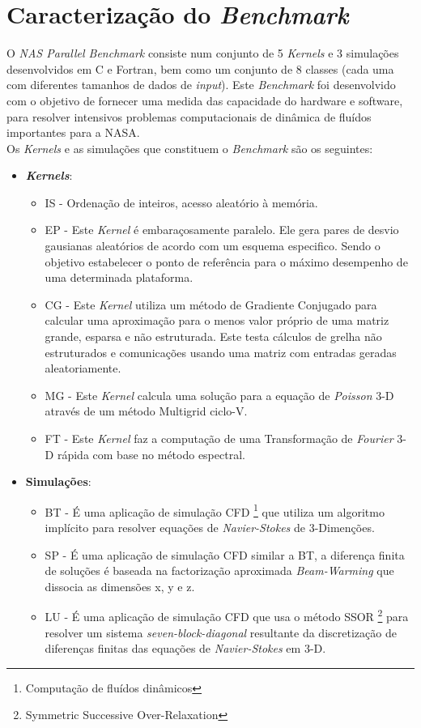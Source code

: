 \documentclass[conference,compsoc]{IEEEtran}
\begin{document}
\section{Caracterização do \textit{Benchmark}}
O \textit{NAS Parallel Benchmark}\cite{nas_bench} consiste num conjunto de 5 \textit{Kernels} e 3 simulações desenvolvidos em C e Fortran, bem como um conjunto de 8 classes (cada uma com diferentes tamanhos de dados de \textit{input}). Este \textit{Benchmark} foi desenvolvido com o objetivo de fornecer uma medida das capacidade do hardware e software, para resolver intensivos problemas computacionais de dinâmica de fluídos importantes para a NASA.\\
Os \textit{Kernels} e as simulações que constituem o \textit{Benchmark} são os seguintes:
\begin{itemize}
\item \textit{\textbf{Kernels}}:
\begin{itemize}
\item IS\cite{nas_site} - Ordenação de inteiros, acesso aleatório à memória.
\item EP\cite{nas_bench_1} - Este \textit{Kernel} é embaraçosamente paralelo. Ele gera pares de desvio gausianas aleatórios de acordo com um esquema especifico. Sendo o objetivo estabelecer o ponto de referência para o máximo desempenho de uma determinada plataforma.
\item CG\cite{nas_bench_1} - Este \textit{Kernel} utiliza um método de Gradiente Conjugado para calcular uma aproximação para o menos valor próprio de uma matriz grande, esparsa e não estruturada. Este testa cálculos de grelha não estruturados e comunicações usando uma matriz com entradas geradas aleatoriamente.
\item MG\cite{nas_bench_1} - Este \textit{Kernel} calcula uma solução para a equação de \textit{Poisson} 3-D através de um método Multigrid ciclo-V.
\item FT\cite{nas_bench_1} - Este \textit{Kernel} faz a computação de uma Transformação de \textit{Fourier} 3-D rápida com base no método espectral.
\end{itemize}
\item \textbf{Simulações}:
\begin{itemize}
\item BT\cite{nas_bench_1} - É uma aplicação de simulação CFD \footnote{Computação de fluídos dinâmicos} que utiliza um algoritmo implícito para resolver equações de \textit{Navier-Stokes} de 3-Dimenções.
\item SP\cite{nas_bench_1} - É uma aplicação de simulação CFD similar a BT, a diferença finita de soluções é baseada na factorização aproximada \textit{Beam-Warming} que dissocia as dimensões x, y e z. 
\item LU\cite{nas_bench_1} - É uma aplicação de simulação CFD que usa o método SSOR \footnote{Symmetric Successive Over-Relaxation} para resolver um sistema \textit{seven-block-diagonal} resultante da discretização de diferenças finitas das equações de \textit{Navier-Stokes} em 3-D.
\end{itemize}
\end{itemize}
\end{document}
